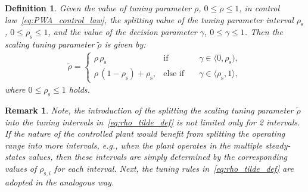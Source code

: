 \documentclass[preprint,12pt]{elsarticle}
\newtheorem{remark}[theorem]{Remark}
\newtheorem{definition}{Definition}[section]
\begin{document}
	
	\begin{definition}
		\label{def:rho_tilde}
		Given the value of tuning parameter $\rho$, $0 \leq \rho \leq 1$, in control law~\eqref{eq:PWA_control_law}, the splitting value of the tuning parameter interval $\rho_{\mathrm{s}}$, $0 \leq \rho_{\mathrm{s}} \leq 1$, and the value of the decision parameter $\gamma$, $0 \leq \gamma \leq 1$. Then the scaling tuning parameter $\widetilde{\rho}$ is given by:		
		\begin{eqnarray}
			\label{eq:rho_tilde_def}
			\widetilde{\rho} = \left\{ 
			\begin{matrix}
				\rho \, \rho_{\mathrm{s}} & \mathrm{if} & \quad \gamma \in \langle 0, \rho_{\mathrm{s}} ), \\
				\rho \, (1-\rho_{\mathrm{s}}) + \rho_{\mathrm{s}}, & \mathrm{else}\,\,\mathrm{if} &\quad \gamma \in \langle \rho_{\mathrm{s}}, 1 \rangle,
			\end{matrix}
			\right.
		\end{eqnarray}
		where $0 \leq \rho_{\mathrm{s}} \leq 1$ holds.
		\end{definition}


	
	\begin{remark}
		\label{rem:rho_tilde}
		Note, the introduction of the splitting the scaling tuning parameter $\widetilde{\rho}$ into the tuning intervals in~\eqref{eq:rho_tilde_def} is not limited only for 2 intervals. If the nature of the controlled plant would benefit from splitting the operating range into more intervals, e.g., when the plant operates in the multiple steady-states values, then these intervals are simply determined by the corresponding values of $\rho_{\mathrm{s},i}$ for each interval. Next, the tuning rules in~\eqref{eq:rho_tilde_def} are adopted in the analogous way.
	\end{remark}
	
\end{document}
